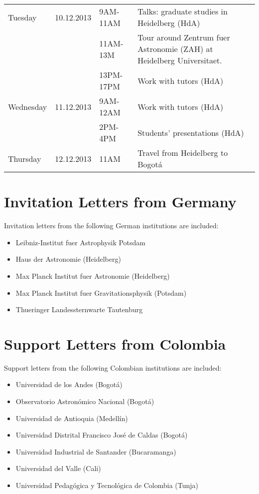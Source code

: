 \documentclass[12pt]{article}
\begin{document}
\begin{tabular}{p{2cm}p{2cm}p{2.5cm}p{7.0cm}}
Tuesday &10.12.2013  & 9AM-11AM & Talks: graduate studies in Heidelberg (HdA)\\
& & 11AM-13M & Tour around Zentrum fuer Astronomie (ZAH) at Heidelberg Universitaet.\\
 & & 13PM-17PM & Work with tutors (HdA)\\\hline

Wednesday &11.12.2013 & 9AM-12AM	&Work with tutors (HdA)\\
& & 2PM-4PM  & Students' presentations (HdA)\\\hline

Thursday &12.12.2013&11AM	& Travel from Heidelberg to Bogot\'a\\\hline\hline
\end{tabular}



\section{Invitation Letters from Germany}
Invitation letters from the following German institutions are included:

\begin{itemize}
\item Leibniz-Institut fuer Astrophysik Potsdam
\item Haus der Astronomie (Heidelberg)
\item Max Planck Institut fuer Astronomie (Heidelberg)
\item Max Planck Institut fuer Gravitationsphysik (Potsdam)
\item Thueringer Landessternwarte Tautenburg
\end{itemize}

\newpage

\section{Support Letters from Colombia}
Support letters from the following Colombian institutions are included:
\begin{itemize}
\item Universidad de los Andes (Bogot\'a)
\item Observatorio Astron\'omico Nacional (Bogot\'a)
\item Universidad de Antioquia (Medell\'in)
\item Universidad Distrital Francisco Jos\'e de Caldas (Bogot\'a)
\item Universidad Industrial de Santander (Bucaramanga)
\item Universidad del Valle (Cali)
\item Universidad Pedag\'ogica y Tecnol\'ogica de Colombia (Tunja)
\end{itemize}
\end{document}
